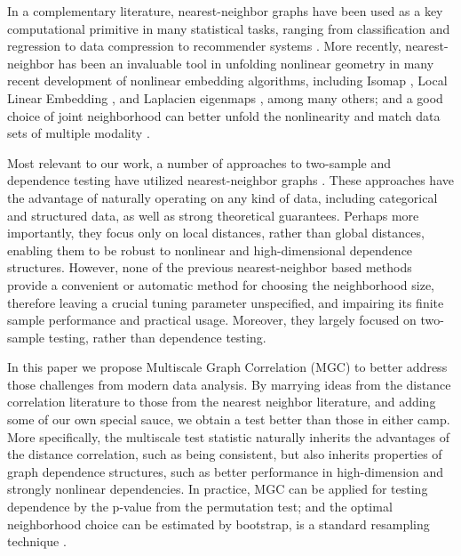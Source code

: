 \documentclass[11pt]{article}
\begin{document}
In a complementary literature, nearest-neighbor graphs have been used as a key computational primitive in many statistical tasks, ranging from classification and regression \cite{Stone1977} to data compression to recommender systems \cite{Sarwar2000}. 
More recently, nearest-neighbor has been an invaluable tool in unfolding nonlinear geometry in many recent development of nonlinear embedding algorithms, including Isomap \cite{TenenbaumSilvaLangford2000, SilvaTenenbaum2003}, Local Linear Embedding \cite{SaulRoweis2000, RoweisSaul2003}, and Laplacien eigenmaps \cite{BelkinNiyogi2003}, among many others; and a good choice of joint neighborhood can better unfold the nonlinearity and match data sets of multiple modality \cite{ShenVogelsteinPriebe2015}.

Most relevant to our work, a number of approaches to two-sample and dependence testing have utilized nearest-neighbor graphs \cite{David1966,Friedman1983,Schilling1986,Dumcke2014}.  These approaches have the advantage of naturally operating on any kind of data, including categorical and structured data, as well as strong theoretical guarantees.  Perhaps more importantly, they focus only on local distances, rather than global distances, enabling them to be robust to nonlinear and high-dimensional dependence structures.  However, none of the previous nearest-neighbor based methods provide a convenient or automatic method for choosing the neighborhood size, therefore leaving a crucial tuning parameter unspecified, and impairing its finite sample performance and practical usage. Moreover, they largely focused on two-sample testing, rather than dependence testing.  

In this paper we propose Multiscale Graph Correlation (MGC) to better address those challenges from modern data analysis. By marrying ideas from the distance correlation literature to those from the nearest neighbor literature, and adding some of our own special sauce, we obtain a test better than those in either camp.  More specifically,  the multiscale test statistic naturally inherits the advantages of the distance correlation, such as being consistent, but also inherits properties of graph dependence structures, such as better performance in high-dimension and strongly nonlinear dependencies. In practice, MGC can be applied for testing dependence by the p-value from the permutation test; and the optimal neighborhood choice can be estimated by bootstrap,  is a standard resampling technique \cite{EfronTibshiraniBook}.
\end{document}
